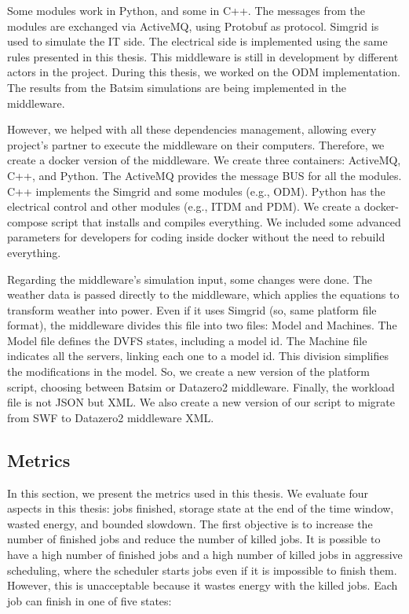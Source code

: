 Some modules work in Python, and some in C++. The messages from the modules are exchanged via ActiveMQ, using Protobuf as protocol. Simgrid is used to simulate the IT side. The electrical side is implemented using the same rules presented in this thesis. This middleware is still in development by different actors in the project. During this thesis, we worked on the ODM implementation. The results from the Batsim simulations are being implemented in the middleware. 

However, we helped with all these dependencies management, allowing every project's partner to execute the middleware on their computers. Therefore, we create a docker version of the middleware. We create three containers: ActiveMQ, C++, and Python. The ActiveMQ provides the message BUS for all the modules. C++ implements the Simgrid and some modules (e.g., ODM). Python has the electrical control and other modules (e.g., ITDM and PDM). We create a docker-compose script that installs and compiles everything. We included some advanced parameters for developers for coding inside docker without the need to rebuild everything.

Regarding the middleware's simulation input, some changes were done. The weather data is passed directly to the middleware, which applies the equations to transform weather into power. Even if it uses Simgrid (so, same platform file format), the middleware divides this file into two files: Model and Machines. The Model file defines the DVFS states, including a model id. The Machine file indicates all the servers, linking each one to a model id. This division simplifies the modifications in the model. So, we create a new version of the platform script, choosing between Batsim or Datazero2 middleware. Finally, the workload file is not JSON but XML. We also create a new version of our script to migrate from SWF to Datazero2 middleware XML.

\subsection{Metrics}

In this section, we present the metrics used in this thesis. We evaluate four aspects in this thesis: jobs finished, storage state at the end of the time window, wasted energy, and bounded slowdown. The first objective is to increase the number of finished jobs and reduce the number of killed jobs. It is possible to have a high number of finished jobs and a high number of killed jobs in aggressive scheduling, where the scheduler starts jobs even if it is impossible to finish them. However, this is unacceptable because it wastes energy with the killed jobs. Each job can finish in one of five states: 

